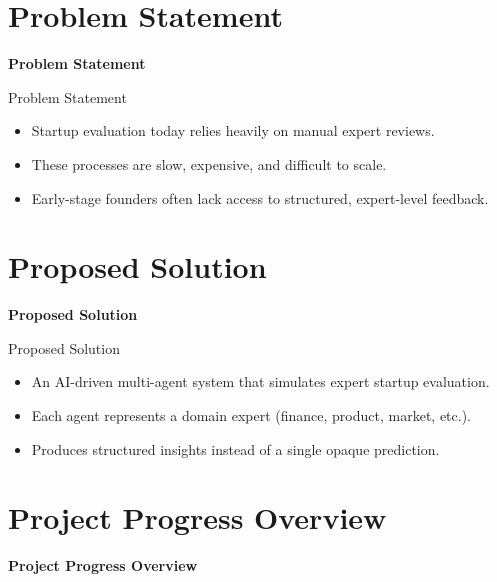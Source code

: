 \documentclass{beamer}
\begin{document}
\section{Problem Statement}

\begin{frame}
\centering
\Huge \textbf{Problem Statement}
\end{frame}

\begin{frame}{Problem Statement}
\begin{itemize}
    \item Startup evaluation today relies heavily on manual expert reviews.
    \item These processes are slow, expensive, and difficult to scale.
    \item Early-stage founders often lack access to structured, expert-level feedback.
\end{itemize}
\end{frame}

\section{Proposed Solution}

\begin{frame}
\centering
\Huge \textbf{Proposed Solution}
\end{frame}

\begin{frame}{Proposed Solution}
\begin{itemize}
    \item An AI-driven multi-agent system that simulates expert startup evaluation.
    \item Each agent represents a domain expert (finance, product, market, etc.).
    \item Produces structured insights instead of a single opaque prediction.
\end{itemize}
\end{frame}

\section{Project Progress Overview}

\begin{frame}
\centering
\Huge \textbf{Project Progress Overview}
\end{frame}
\end{document}
